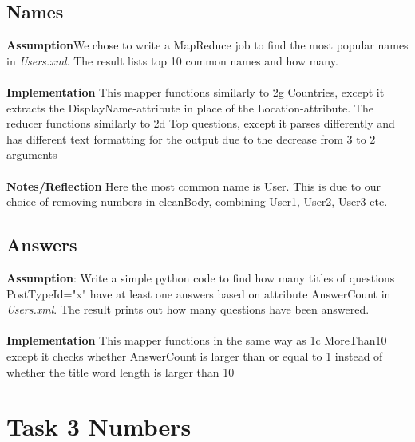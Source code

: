 \documentclass[fleqn,10pt]{wlscirep}
\begin{document}
\subsection{Names}
\textbf{Assumption}We chose to write a MapReduce job to find the most popular names in \textit{Users.xml}. The result lists top 10 common names and how many.  \\ \\
\textbf{Implementation} This mapper functions similarly to 2g Countries, except it extracts the DisplayName-attribute in place of the Location-attribute. The reducer functions similarly to 2d Top questions, except it parses differently and has different text formatting for the output due to the decrease from 3 to 2 arguments \\ \\
\textbf{Notes/Reflection} Here the most common name is User. This is due to our choice of removing numbers in cleanBody, combining User1, User2, User3 etc.



\subsection{Answers }
\textbf{Assumption}: Write a simple python code to find how many titles of questions PostTypeId="x" have at least one answers based on attribute AnswerCount in \textit{Users.xml}. The result prints out how many questions have been answered.  \\ \\
\textbf{Implementation} This mapper functions in the same way as 1c MoreThan10 except it checks whether AnswerCount is larger than or equal to 1 instead of whether the title word length is larger than 10


\section{Task 3 Numbers}
\end{document}
